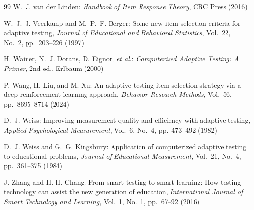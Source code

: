 \documentclass[dvipdfmx,a4j]{jarticle}
\begin{document}
\begin{thebibliography}{99}
W.~J. van der Linden:
\textit{Handbook of Item Response Theory},
CRC Press (2016)

W.~J.~J. Veerkamp and M.~P.~F. Berger:
Some new item selection criteria for adaptive testing,
\textit{Journal of Educational and Behavioral Statistics},
Vol.~22, No.~2, pp.~203--226 (1997)

H. Wainer, N.~J. Dorans, D. Eignor, \textit{et al}.:
\textit{Computerized Adaptive Testing: A Primer},
2nd ed., Erlbaum (2000)

P. Wang, H. Liu, and M. Xu:
An adaptive testing item selection strategy via a deep reinforcement learning approach,
\textit{Behavior Research Methods}, Vol.~56, pp.~8695--8714 (2024)

D.~J. Weiss:
Improving measurement quality and efficiency with adaptive testing,
\textit{Applied Psychological Measurement}, Vol.~6, No.~4, pp.~473--492 (1982)

D.~J. Weiss and G.~G. Kingsbury:
Application of computerized adaptive testing to educational problems,
\textit{Journal of Educational Measurement}, Vol.~21, No.~4, pp.~361--375 (1984)

J. Zhang and H.-H. Chang:
From smart testing to smart learning: How testing technology can assist the new generation of education,
\textit{International Journal of Smart Technology and Learning},
Vol.~1, No.~1, pp.~67--92 (2016)

\end{thebibliography}
\end{document}
